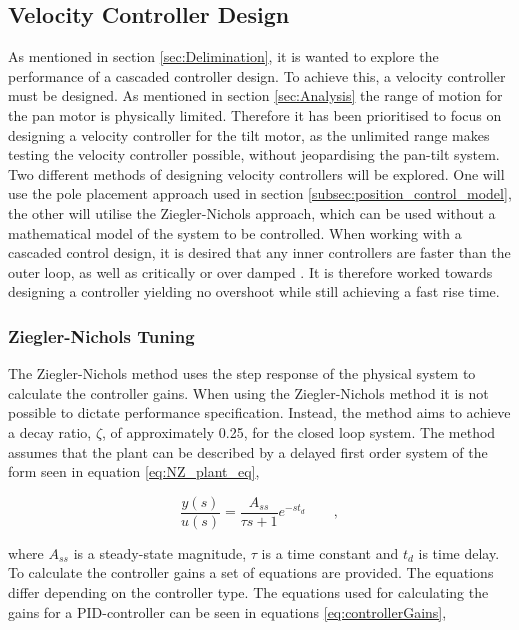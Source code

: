 \documentclass[../../main.tex]{subfiles}
\begin{document}
\subsection{Velocity Controller Design} \label{subsec:vel_controller_design}
As mentioned in section \ref{sec:Delimination}, it is wanted to explore the performance of a cascaded controller design. To achieve this, a velocity controller must be designed. As mentioned in section \ref{sec:Analysis} the range of motion for the pan motor is physically limited. Therefore it has been prioritised to focus on designing a velocity controller for the tilt motor, as the unlimited range makes testing the velocity controller possible, without jeopardising the pan-tilt system. Two different methods of designing velocity controllers will be explored. One will use the pole placement approach used in section \ref{subsec:position_control_model}, the other will utilise the Ziegler-Nichols approach, which can be used without a mathematical model of the system to be controlled.
When working with a cascaded control design, it is desired that any inner controllers are faster than the outer loop, as well as critically or over damped \cite{CascadeControl}. It is therefore worked towards designing a controller yielding no overshoot while still achieving a fast rise time.

\subsubsection*{Ziegler-Nichols Tuning}
The Ziegler-Nichols method uses the step response of the physical system to calculate the controller gains. When using the Ziegler-Nichols method it is not possible to dictate performance specification. Instead, the method aims to achieve a decay ratio, $\zeta$, of approximately 0.25, for the closed loop system. The method assumes that the plant can be described by a delayed first order system of the form seen in equation \ref{eq:NZ_plant_eq},

\begin{equation}
    \frac{y(s)}{u(s)} = \frac{A_{ss}}{\tau s + 1} e^{-s t_d} \qquad ,
    \label{eq:NZ_plant_eq}
\end{equation}

where $A_{ss}$ is a steady-state magnitude, $\tau$ is a time constant and $t_{d}$ is time delay. To calculate the controller gains a set of equations are provided. The equations differ depending on the controller type. The equations used for calculating the gains for a PID-controller can be seen in equations \ref{eq:controllerGains},
\end{document}

